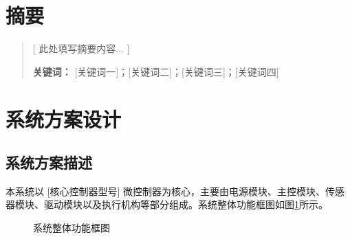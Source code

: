 \documentclass{ctexart}
\begin{document}
\section*{摘要}
\begin{quote}
    \noindent
    [ 此处填写摘要内容... ]

    \vspace{1cm}
    \noindent
    \textbf{关键词：} [关键词一]；[关键词二]；[关键词三]；[关键词四] %
\end{quote}

\newpage
\tableofcontents
\newpage


\section{系统方案设计}
\subsection{系统方案描述}
    本系统以 [核心控制器型号] 微控制器为核心，主要由电源模块、主控模块、传感器模块、驱动模块以及执行机构等部分组成。系统整体功能框图如图\ref{fig:system_block}所示。
    
\begin{figure}[H]
	\centering
	\caption{系统整体功能框图}
	\label{fig:system_block}
\end{figure}
\end{document}
